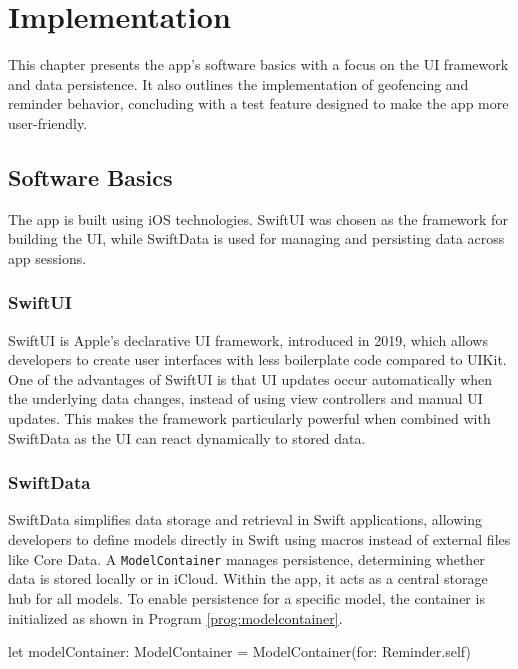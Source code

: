 \chapter{Implementation}
\label{cha:Implementation}

This chapter presents the app's software basics with a focus on the \ac{UI} framework and data persistence.
It also outlines the implementation of geofencing and reminder behavior, concluding with a test feature designed to make the app more user-friendly.

\section{Software Basics}
The app is built using iOS technologies.
SwiftUI was chosen as the framework for building the \acs{UI}, while SwiftData is used for managing and persisting data across app sessions.

\subsection{SwiftUI}
SwiftUI is Apple's declarative \acs{UI} framework, introduced in 2019, which allows developers to create user interfaces with less boilerplate code compared to UIKit.
One of the advantages of SwiftUI is that \acs{UI} updates occur automatically when the underlying data changes, instead of using view controllers and manual \acs{UI} updates.
This makes the framework particularly powerful when combined with SwiftData as the \acs{UI} can react dynamically to stored data.

\subsection{SwiftData}
SwiftData simplifies data storage and retrieval in Swift applications, allowing developers to define models directly in Swift using macros instead of external files like Core Data. 
A \lstinline{ModelContainer} manages persistence, determining whether data is stored locally or in iCloud. 
Within the app, it acts as a central storage hub for all models.
To enable persistence for a specific model, the container is initialized as shown in Program \ref{prog:modelcontainer}.

\begin{program}
    \begin{SwiftCode}
    let modelContainer: ModelContainer = ModelContainer(for: Reminder.self)\end{SwiftCode}
    \caption{Initializing the \lstinline{ModelContainer} for SwiftData persistence}
    \label{prog:modelcontainer}
\end{program}

